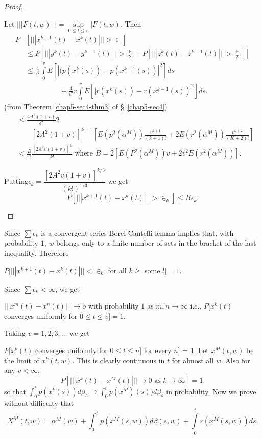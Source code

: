\begin{proof}
\begin{itemize}
Let $||| F (t, w) ||| =\sup\limits_{ 0 \leq t \leq v } | F (t, w)$. Then 
\begin{align*}
P & \left[ ||| x ^{ k + 1} (t) - x^k (t) |||> \in \right]\\ 
  & \leq P \left[
      ||| y^k (t) - y^{ k - 1} (t) ||| > \frac{\in}{2} + P\left[ ||| z^k
        (t) - z ^{ k - 1} (t) ||| > \frac{\in}{2}\right]  \right] \\ 
    & \leq \frac{4}{\epsilon^2} \int\limits^v _0 E \left[ | (p (x^k (s) ) -
      p(x^{k-1}(s))|^2 \right] ds\\ 
    & \hspace{2cm}+ \frac{4}{\epsilon^2} v \int\limits^v_0 E
    \left[ | r (x^k (s)) -r ( x^{k -1}(s) ) ^2 \right]ds. 
\end{align*}
(from Theorem \ref{chap5-sec4-thm3} of \S\ \ref{chap5-sec4})
\begin{align*}
& \leq \frac{4A^2 (1 + v)}{\epsilon^2}2\\ 
& \qquad \left[ 2A^2 (1 + v)\right]^{ k - 1}
    \left[ E (p^2 (\alpha ^M) ) \frac{ v^{k+1}}{(k+1)!} + 2E (r^2
      (\alpha^M )) \frac{v^{k+2}}{(K + 2)!} \right]\\ 
    & < \frac{B}{\epsilon^2} \frac{[2A^2 v (1 + v)]^k}{k!} \text{\ where\ }
    B= 2 \left[ E ( P^2 (\alpha^M ) ) v + 2 v^2 E (r^2 (\alpha^M
      ))\right] . 
\end{align*}
  
Putting\pageoriginale $\epsilon_k = \dfrac{[ 2 A^2 v (1 + v)]^{ k /
    3}}{(k! ) ^{ 1/3}}$ we get  
$$
P \left[||| x^{ k +1} (t) - x^k (t) ||| > \in _k \right]\leq B \epsilon_k . 
$$
\end{itemize}
\end{proof}

Since $\sum \epsilon_k$ is a convergent series Borel-Cantelli lemma
implies that, with probability $1$, $w$ belongs only to a finite
number of sets in the bracket of the last inequality. Therefore  

$P [ ||| x^{ k +1} (t) - x^k (t) ||| < \in _k$ for all $k \geq$ some $l] = 1$. 

Since $\sum \epsilon_k < \infty$, we get 

$||| x^m (t) - x^n (t) ||| \to o$ with probability $1$ as $m, n \to \infty$
i.e., $P [ x^k (t)$ converges uniformly for $0 \leq t \leq v] = 1$. 

Taking $v = 1, 2, 3, \ldots$ we get 

$P[x^k (t)$ converges unifolmly for $0 \leq t \leq n$] for every
$n$] = 1. Let $x^M (t, w )$ be the limit of $x^k (t, w) $. This is
    clearly continuous in $t$ for almost all $w$. Also for any $v <
    \infty$,  
$$
P \left[ ||| x^k (t) - x^M (t) ||| \to 0 \text{ as } k \to \infty \right] = 1. 
$$
so that $\int ^t _0 p (x^k (s)) d \beta _s \to \int^t _0 p (x^M)(s)) d
\beta_s $ in probability. Now we prove without difficulty that  
$$
X^M (t, w) = \alpha ^M (w) + \int^t_0 p (x^M (s, w )) d \beta (s, w )
+ \int\limits^t _0 r (x ^M (s, w ) )ds.  
$$

